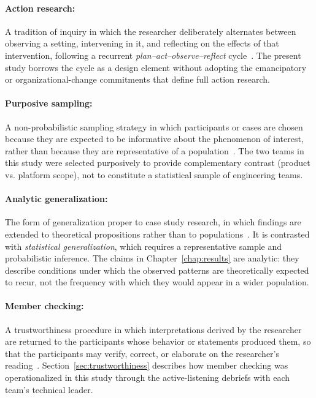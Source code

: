 \paragraph{Action research:} A tradition of inquiry in which the researcher
deliberately alternates between observing a setting, intervening in it, and
reflecting on the effects of that intervention, following a recurrent
\emph{plan--act--observe--reflect} cycle~\citep{robson2016}. The present study
borrows the cycle as a design element without
adopting the emancipatory or organizational-change commitments that define
full action research.

\paragraph{Purposive sampling:} A non-probabilistic sampling strategy in which
participants or cases are chosen because they are expected to be informative
about the phenomenon of interest, rather than because they are representative
of a population~\citep{robson2016}. The two teams in this study were selected
purposively to provide complementary contrast (product vs. platform scope),
not to constitute a statistical sample of engineering teams.

\paragraph{Analytic generalization:} The form of generalization proper to case
study research, in which findings are extended to theoretical propositions
rather than to populations~\citep{robson2016,yin2009}. It is contrasted with
\emph{statistical generalization}, which requires a representative sample and
probabilistic inference. The claims in Chapter~\ref{chap:results} are analytic:
they describe conditions under which the observed patterns are theoretically
expected to recur, not the frequency with which they would appear in a wider
population.

\paragraph{Member checking:} A trustworthiness procedure in which
interpretations derived by the researcher are returned to the participants
whose behavior or statements produced them, so that the participants may
verify, correct, or elaborate on the researcher's reading~\citep{robson2016}.
Section~\ref{sec:trustworthiness} describes how member checking was
operationalized in this study through the active-listening debriefs with each
team's technical leader.

